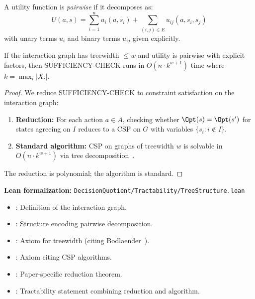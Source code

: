 \begin{definition}\label{def:pairwise}
A utility function is \emph{pairwise} if it decomposes as:
\[
U(a, s) = \sum_{i=1}^n u_i(a, s_i) + \sum_{(i,j) \in E} u_{ij}(a, s_i, s_j)
\]
with unary terms $u_i$ and binary terms $u_{ij}$ given explicitly.
\end{definition}

\begin{theorem}\label{thm:treewidth}
If the interaction graph has treewidth $\leq w$ and utility is pairwise with explicit factors, then SUFFICIENCY-CHECK runs in $O(n \cdot k^{w+1})$ time where $k = \max_i |X_i|$.
\end{theorem}

\begin{proof}
We reduce SUFFICIENCY-CHECK to constraint satisfaction on the interaction graph:
\begin{enumerate}
\item \textbf{Reduction:} For each action $a \in A$, checking whether $\Opt(s) = \Opt(s')$ for states agreeing on $I$ reduces to a CSP on $G$ with variables $\{s_i : i \notin I\}$.
\item \textbf{Standard algorithm:} CSP on graphs of treewidth $w$ is solvable in $O(n \cdot k^{w+1})$ via tree decomposition~\cite{bodlaender1993tourist,freuder1990complexity}.
\end{enumerate}
The reduction is polynomial; the algorithm is standard.
\end{proof}

\noindent\textbf{Lean formalization:} \texttt{DecisionQuotient/Tractability/TreeStructure.lean}
\begin{itemize}
\item {}: Definition of the interaction graph.
\item {}: Structure encoding pairwise decomposition.
\item {}: Axiom for treewidth (citing Bodlaender~\cite{bodlaender1993tourist}).
\item {}: Axiom citing CSP algorithms.
\item {}: Paper-specific reduction theorem.
\item {}: Tractability statement combining reduction and algorithm.
\end{itemize}


